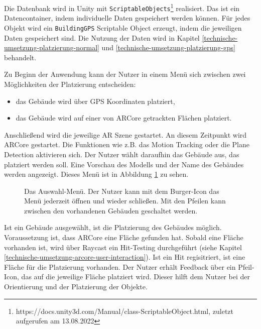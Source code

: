 Die Datenbank wird in Unity mit \texttt{ScriptableObjects}\footnote{https://docs.unity3d.com/Manual/class-ScriptableObject.html, zuletzt aufgerufen am 13.08.2022} realisiert. Das ist ein Datencontainer, indem individuelle Daten gespeichert werden können. Für jedes Objekt wird ein \texttt{BuildingGPS} Scriptable Object erzeugt, indem die jeweiligen Daten gespeichert sind. Die Nutzung der Daten wird in Kapitel \ref*{technische-umsetzung-platzierung-normal} und \ref*{technische-umsetzung-platzierung-gps} behandelt.

Zu Beginn der Anwendung kann der Nutzer in einem Menü sich zwischen zwei Möglichkeiten der Platzierung entscheiden:
\begin{itemize}
    \item das Gebäude wird über GPS Koordinaten platziert,
    \item das Gebäude wird auf einer von ARCore getrackten Flächen platziert.
\end{itemize}

Anschließend wird die jeweilige AR Szene gestartet. An diesem Zeitpunkt wird ARCore gestartet. Die Funktionen wie z.B. das Motion Tracking oder die Plane Detection aktivieren sich. Der Nutzer wählt daraufhin das Gebäude aus, das platziert werden soll. Eine Vorschau des Modells und der Name des Gebäudes werden angezeigt. Dieses Menü ist in Abbildung \ref*{fig:konzept-auswahl-menue} zu sehen. 

\begin{figure}[H]
    \centering
    \qquad
    \caption{Das Auswahl-Menü. Der Nutzer kann mit dem Burger-Icon das Menü jederzeit öffnen und wieder schließen. Mit den Pfeilen kann zwischen den vorhandenen Gebäuden geschaltet werden.}%
    \label{fig:konzept-auswahl-menue}
\end{figure}

Ist ein Gebäude ausgewählt, ist die Platzierung des Gebäudes möglich. Voraussetzung ist, dass ARCore eine Fläche gefunden hat. Sobald eine Fläche vorhanden ist, wird über Raycast ein Hit-Testing durchgeführt (siehe Kapitel \ref*{technische-umsetzung-arcore-user-interaction}). Ist ein Hit regisitriert, ist eine Fläche für die Platzierung vorhanden. Der Nutzer erhält Feedback über ein Pfeil-Icon, das auf die jeweilige Fläche platziert wird. Dieser hilft dem Nutzer bei der Orientierung und der Platzierung der Objekte.

